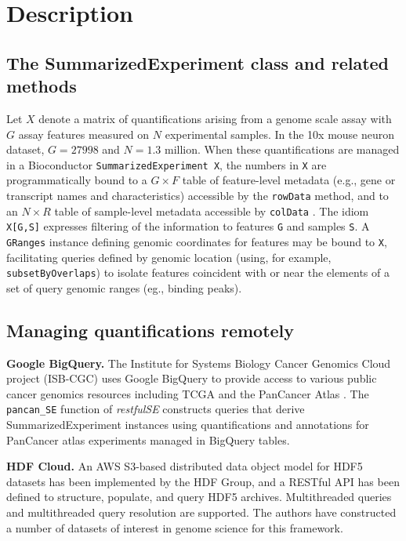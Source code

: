 \documentclass[applications]{gen-bioinformatics}
\newcommand{\Rpackage}[1]{{\textit{#1}}}
\begin{document}
\section*{Description}

\subsection*{The SummarizedExperiment class and related methods}

Let $X$ denote a matrix of quantifications arising from a genome
scale assay with $G$ assay features measured on $N$ experimental
samples.  In the 10x mouse neuron dataset, $G=27998$ and $N=1.3$ million.
When these quantifications are managed in a Bioconductor \verb+SummarizedExperiment X+, the numbers in \verb+X+ are programmatically bound to a $G \times F$
table of feature-level metadata (e.g., gene or transcript names and
characteristics) accessible by the \verb+rowData+ method, and to an $N \times R$ table of sample-level metadata accessible by \verb+colData+ \citep{Huber2015}. 
The idiom \verb+X[G,S]+ expresses filtering of 
the information
to features \verb+G+ and samples \verb+S+.  A \verb+GRanges+ 
instance \citep{Lawrence2013} defining genomic coordinates for features may be bound to \verb+X+,
facilitating queries defined by genomic location (using, for example, \verb+subsetByOverlaps+) to isolate features
coincident with or near the elements of a set of query genomic ranges (eg., binding peaks).

\subsection*{Managing quantifications remotely}

\noindent
\textbf{Google BigQuery.} The Institute for Systems Biology Cancer
Genomics Cloud project (ISB-CGC) \citep{ISBCGC} uses 
Google BigQuery to provide access to
various public cancer genomics resources including
TCGA and the PanCancer Atlas \citep{Hoadley2018}.
The \verb+pancan_SE+
function of \Rpackage{restfulSE} constructs queries that derive
SummarizedExperiment instances using quantifications and annotations
for PanCancer atlas experiments
managed in BigQuery tables.  

\noindent
\textbf{HDF Cloud.}  
An AWS S3-based distributed data object model for HDF5
datasets has been implemented by the HDF Group, and
a RESTful API has been defined to structure, populate,
and query HDF5 archives.  Multithreaded queries and
multithreaded query resolution are supported.
The authors have constructed a number of datasets of
interest in genome science for this framework.
\end{document}
